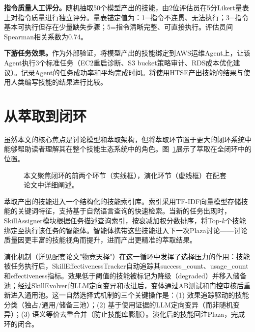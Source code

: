 \documentclass[conference]{IEEEtran}
\begin{document}
\textbf{指令质量人工评分。}随机抽取50个模型产出的技能，由2位评估员在5分Likert量表上对指令质量进行独立评分。量表锚定值为：1=指令不连贯、无法执行；3=指令基本可执行但存在少量缺失步骤；5=指令清晰完整、可直接执行。评估员间Spearman相关系数为0.74。

\textbf{下游任务效果。}作为外部验证，将模型产出的技能绑定到AWS运维Agent上，让该Agent执行3个标准任务（EC2重启诊断、S3 bucket策略审计、RDS成本优化建议）。记录Agent的任务成功率和平均完成时间。将使用HTSE产出技能的结果与使用人类编写技能的结果进行比较。

\section{从萃取到闭环}

虽然本文的核心焦点是讨论模型和萃取架构，但将萃取环节置于更大的闭环系统中能够帮助读者理解其在整个技能生态系统中的角色。图~\ref{fig:loop_context}展示了萃取在全闭环中的位置。

\begin{figure}[t]
\centering
{}
\caption{本文聚焦闭环的前两个环节（实线框），演化环节（虚线框）在配套论文中详细阐述。}
\label{fig:loop_context}
\end{figure}

萃取产出的技能进入一个结构化的技能索引库。索引采用TF-IDF向量模型存储技能的关键词特征，支持基于自然语言查询的快速检索。当新的任务出现时，SkillAssigner模块根据任务描述查询索引，按衰减加权分数排序，将Top-$k$个技能绑定至执行该任务的智能体。智能体携带这些技能进入下一次Plaza讨论——讨论质量因更丰富的技能视角而提升，进而产出更精准的萃取结果。

演化机制（详见配套论文"物竞天择"）在这一循环中发挥了选择压力的作用：技能被任务执行后，SkillEffectivenessTracker自动追踪其success\_count、usage\_count和effectiveness指标。效果低于阈值的技能被标记为降级（degraded）并移入储备池；经过SkillEvolver的LLM定向变异和改进后，变体通过AB测试和门控审核后重新进入通用池。这一自然选择式机制的三个关键操作是：(1) 效果追踪驱动的技能分类（独占/通用/储备三池）；(2) 基于使用证据的LLM定向变异（而非随机变异）；(3) 语义等价去重合并（防止技能库膨胀）。演化后的技能回注Plaza，完成环的闭合。
\end{document}
